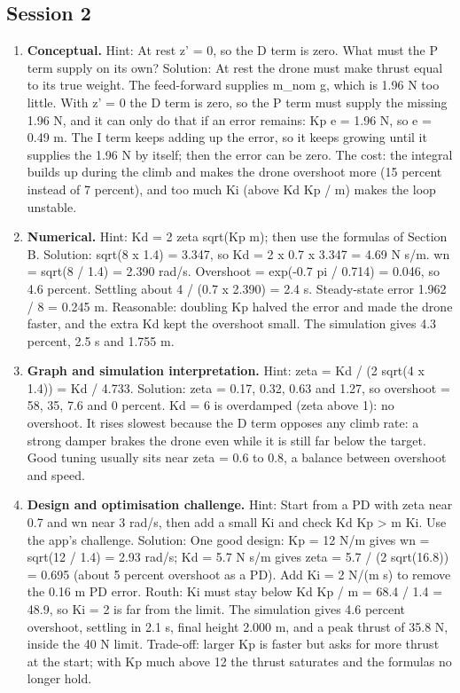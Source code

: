 \documentclass[11pt,a4paper]{article}
\begin{document}
\subsection*{Session 2}
\begin{enumerate}[nosep]
\item \textbf{Conceptual.} Hint: At rest z' = 0, so the D term is zero. What must the P term supply on its own? Solution: At rest the drone must make thrust equal to its true weight. The feed-forward supplies m\_nom g, which is 1.96 N too little. With z' = 0 the D term is zero, so the P term must supply the missing 1.96 N, and it can only do that if an error remains: Kp e = 1.96 N, so e = 0.49 m. The I term keeps adding up the error, so it keeps growing until it supplies the 1.96 N by itself; then the error can be zero. The cost: the integral builds up during the climb and makes the drone overshoot more (15 percent instead of 7 percent), and too much Ki (above Kd Kp / m) makes the loop unstable.
\item \textbf{Numerical.} Hint: Kd = 2 zeta sqrt(Kp m); then use the formulas of Section B. Solution: sqrt(8 x 1.4) = 3.347, so Kd = 2 x 0.7 x 3.347 = 4.69 N s/m. wn = sqrt(8 / 1.4) = 2.390 rad/s. Overshoot = exp(-0.7 pi / 0.714) = 0.046, so 4.6 percent. Settling about 4 / (0.7 x 2.390) = 2.4 s. Steady-state error 1.962 / 8 = 0.245 m. Reasonable: doubling Kp halved the error and made the drone faster, and the extra Kd kept the overshoot small. The simulation gives 4.3 percent, 2.5 s and 1.755 m.
\item \textbf{Graph and simulation interpretation.} Hint: zeta = Kd / (2 sqrt(4 x 1.4)) = Kd / 4.733. Solution: zeta = 0.17, 0.32, 0.63 and 1.27, so overshoot = 58, 35, 7.6 and 0 percent. Kd = 6 is overdamped (zeta above 1): no overshoot. It rises slowest because the D term opposes any climb rate: a strong damper brakes the drone even while it is still far below the target. Good tuning usually sits near zeta = 0.6 to 0.8, a balance between overshoot and speed.
\item \textbf{Design and optimisation challenge.} Hint: Start from a PD with zeta near 0.7 and wn near 3 rad/s, then add a small Ki and check Kd Kp > m Ki. Use the app's challenge. Solution: One good design: Kp = 12 N/m gives wn = sqrt(12 / 1.4) = 2.93 rad/s; Kd = 5.7 N s/m gives zeta = 5.7 / (2 sqrt(16.8)) = 0.695 (about 5 percent overshoot as a PD). Add Ki = 2 N/(m s) to remove the 0.16 m PD error. Routh: Ki must stay below Kd Kp / m = 68.4 / 1.4 = 48.9, so Ki = 2 is far from the limit. The simulation gives 4.6 percent overshoot, settling in 2.1 s, final height 2.000 m, and a peak thrust of 35.8 N, inside the 40 N limit. Trade-off: larger Kp is faster but asks for more thrust at the start; with Kp much above 12 the thrust saturates and the formulas no longer hold.
\end{enumerate}
\end{document}
